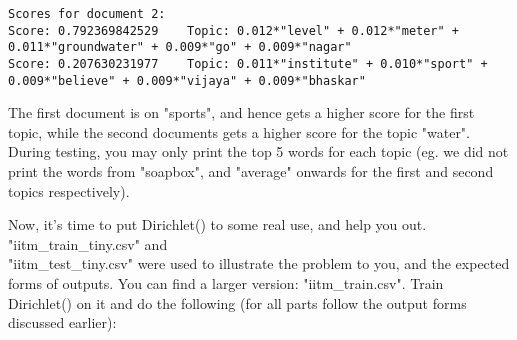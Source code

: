 \documentclass[addpoints,11pt,a4paper]{exam}
\begin{document}
\begin{questions}
\begin{lstlisting}
Scores for document 2:
Score: 0.792369842529	 Topic: 0.012*"level" + 0.012*"meter" +
0.011*"groundwater" + 0.009*"go" + 0.009*"nagar"
Score: 0.207630231977	 Topic: 0.011*"institute" + 0.010*"sport" +
0.009*"believe" + 0.009*"vijaya" + 0.009*"bhaskar"
\end{lstlisting}
The first document is on "sports", and hence gets a higher score for the first topic, while the second documents gets a higher score for the topic "water". During testing, you may only print the top 5 words for each topic (eg. we did not print the words from "soapbox", and "average" onwards for the first and second topics respectively).

Now, it's time to put Dirichlet() to some real use, and help you out. "iitm\_train\_tiny.csv" and \\"iitm\_test\_tiny.csv" were used to illustrate the problem to you, and the expected forms of outputs. You can find a larger version: "iitm\_train.csv". Train Dirichlet() on it and do the following (for all parts follow the output forms discussed earlier):
\end{questions}
\end{document}
